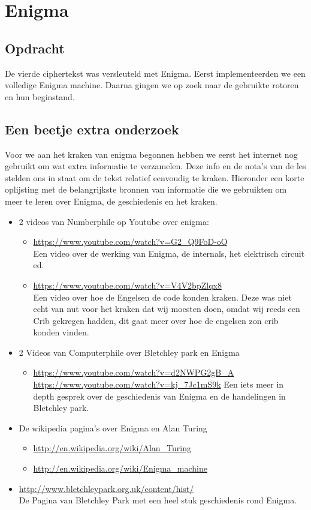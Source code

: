 
\section{Enigma}
\subsection{Opdracht}
De vierde ciphertekst was versleuteld met Enigma. Eerst implementeerden we een volledige Enigma machine. Daarna gingen we op zoek naar de gebruikte rotoren en hun beginstand.

\subsection{Een beetje extra onderzoek}
Voor we aan het kraken van enigma begonnen hebben we eerst het internet nog gebruikt om wat extra informatie te verzamelen. Deze info en de nota's van de les stelden ons in staat om de tekst relatief eenvoudig te kraken.
Hieronder een korte oplijsting met de belangrijkste bronnen van informatie die we gebruikten om meer te leren over Enigma, de geschiedenis en het kraken.

\begin{itemize}
\item 2 videos van Numberphile op Youtube over enigma:
	\begin{itemize}
	\item \url{https://www.youtube.com/watch?v=G2_Q9FoD-oQ} \\
		Een video over de werking van Enigma, de internals, het elektrisch circuit ed.
	\item \url{https://www.youtube.com/watch?v=V4V2bpZlqx8} \\
		Een video over hoe de Engelsen de code konden kraken. Deze was niet echt van nut voor het kraken dat wij moesten doen, omdat wij reeds een Crib gekregen hadden, dit gaat meer over hoe de engelsen zon crib konden vinden.
	\end{itemize}
\item 2 Videos van Computerphile over Bletchley park en Enigma
	\begin{itemize}
	\item \url{https://www.youtube.com/watch?v=d2NWPG2gB_A}
	\url{https://www.youtube.com/watch?v=kj_7Jc1mS9k}
	Een iets meer in depth gesprek over de geschiedenis van Enigma en de handelingen in Bletchley park.
	\end{itemize}
\item De wikipedia pagina's over Enigma en Alan Turing
	\begin{itemize}
		\item \url{http://en.wikipedia.org/wiki/Alan_Turing}
		\item \url{http://en.wikipedia.org/wiki/Enigma_machine}
	\end{itemize}
	\item \url{http://www.bletchleypark.org.uk/content/hist/} \\ De Pagina van Bletchley Park met een heel stuk geschiedenis rond Enigma.
\end{itemize}


